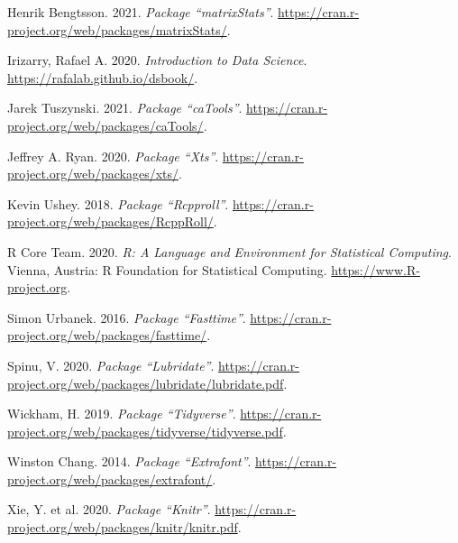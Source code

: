 \documentclass[
  12pt,
]{article}
\begin{document}
\leavevmode\hypertarget{ref-matrixStats}{}%
Henrik Bengtsson. 2021. \emph{Package ``matrixStats''}.
\url{https://cran.r-project.org/web/packages/matrixStats/}.

\leavevmode\hypertarget{ref-iriz}{}%
Irizarry, Rafael A. 2020. \emph{Introduction to Data Science}.
\url{https://rafalab.github.io/dsbook/}.

\leavevmode\hypertarget{ref-caTools}{}%
Jarek Tuszynski. 2021. \emph{Package ``caTools''}.
\url{https://cran.r-project.org/web/packages/caTools/}.

\leavevmode\hypertarget{ref-xts}{}%
Jeffrey A. Ryan. 2020. \emph{Package ``Xts''}.
\url{https://cran.r-project.org/web/packages/xts/}.

\leavevmode\hypertarget{ref-RcppRoll}{}%
Kevin Ushey. 2018. \emph{Package ``Rcpproll''}.
\url{https://cran.r-project.org/web/packages/RcppRoll/}.

\leavevmode\hypertarget{ref-R-base}{}%
R Core Team. 2020. \emph{R: A Language and Environment for Statistical
Computing}. Vienna, Austria: R Foundation for Statistical Computing.
\url{https://www.R-project.org}.

\leavevmode\hypertarget{ref-fasttime}{}%
Simon Urbanek. 2016. \emph{Package ``Fasttime''}.
\url{https://cran.r-project.org/web/packages/fasttime/}.

\leavevmode\hypertarget{ref-lubridate}{}%
Spinu, V. 2020. \emph{Package ``Lubridate''}.
\url{https://cran.r-project.org/web/packages/lubridate/lubridate.pdf}.

\leavevmode\hypertarget{ref-tidyverse}{}%
Wickham, H. 2019. \emph{Package ``Tidyverse''}.
\url{https://cran.r-project.org/web/packages/tidyverse/tidyverse.pdf}.

\leavevmode\hypertarget{ref-extrafont}{}%
Winston Chang. 2014. \emph{Package ``Extrafont''}.
\url{https://cran.r-project.org/web/packages/extrafont/}.

\leavevmode\hypertarget{ref-knitr}{}%
Xie, Y. et al. 2020. \emph{Package ``Knitr''}.
\url{https://cran.r-project.org/web/packages/knitr/knitr.pdf}.
\end{document}
